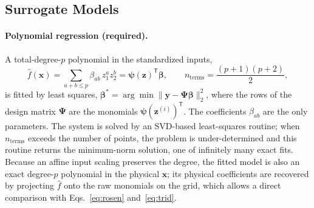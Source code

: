 \subsection{Surrogate Models}\label{sec:models}

\paragraph{Polynomial regression (required).} A total-degree-$p$ polynomial in the standardized inputs,
\begin{equation}
  \hat f(\mathbf{x})=\sum_{a+b\le p}\beta_{ab}\,z_1^a z_2^b=\boldsymbol{\psi}(\mathbf{z})^{\mathsf T}\boldsymbol{\beta},
  \qquad n_{\mathrm{terms}}=\frac{(p+1)(p+2)}{2},
  \label{eq:poly}
\end{equation}
is fitted by least squares, $\boldsymbol{\beta}^*=\arg\min\|\mathbf{y}-\boldsymbol{\Psi}\boldsymbol{\beta}\|_2^2$, where the rows of the design matrix $\boldsymbol{\Psi}$ are the monomials $\boldsymbol{\psi}(\mathbf{z}^{(i)})^{\mathsf T}$. The coefficients $\beta_{ab}$ are the only parameters. The system is solved by an SVD-based least-squares routine; when $n_{\mathrm{terms}}$ exceeds the number of points, the problem is under-determined and this routine returns the minimum-norm solution, one of infinitely many exact fits. Because an affine input scaling preserves the degree, the fitted model is also an exact degree-$p$ polynomial in the physical $\mathbf{x}$; its physical coefficients are recovered by projecting $\hat f$ onto the raw monomials on the grid, which allows a direct comparison with Eqs.~\eqref{eq:rosen} and~\eqref{eq:trid}.

